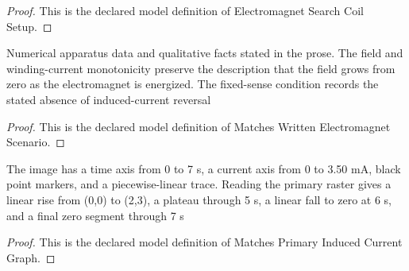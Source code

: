 \begin{proof}
  This is the declared model definition of Electromagnet Search Coil Setup.
\end{proof}
\begin{definition}
  \label{def:physics:phyx-mini-0980:phyxminiproblems-problemphyxmini0980-matcheswrittenelectromagnetscenario}
  Numerical apparatus data and qualitative facts stated in the prose. The field and winding-current monotonicity preserve the description that the field grows from zero as the electromagnet is energized. The fixed-sense condition records the stated absence of induced-current reversal
\end{definition}
\begin{proof}
  This is the declared model definition of Matches Written Electromagnet Scenario.
\end{proof}
\begin{definition}
  \label{def:physics:phyx-mini-0980:phyxminiproblems-problemphyxmini0980-matchesprimaryinducedcurrentgraph}
  The image has a time axis from 0 to 7 s, a current axis from 0 to 3.50 mA, black point markers, and a piecewise-linear trace. Reading the primary raster gives a linear rise from (0,0) to (2,3), a plateau through 5 s, a linear fall to zero at 6 s, and a final zero segment through 7 s
\end{definition}
\begin{proof}
  This is the declared model definition of Matches Primary Induced Current Graph.
\end{proof}
